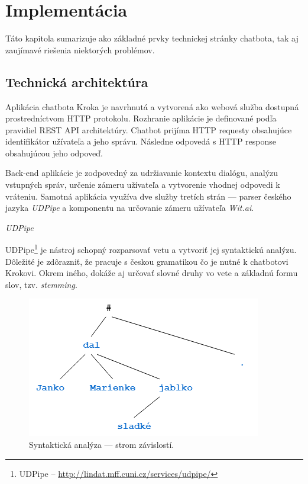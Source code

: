 \documentclass{ExcelAtFIT}
\begin{document}
\section{Implementácia}
Táto kapitola sumarizuje ako základné prvky technickej stránky chatbota, tak aj zaujímavé riešenia niektorých problémov.

\subsection{Technická architektúra}
Aplikácia chatbota Kroka je navrhnutá a vytvorená ako webová služba dostupná prostredníctvom HTTP protokolu. Rozhranie aplikácie je definované podľa pravidiel REST API architektúry. Chatbot prijíma HTTP requesty obsahujúce identifikátor užívateľa a jeho správu. Následne odpovedá s HTTP response obsahujúcou jeho odpoveď.

Back-end aplikácie je zodpovedný za udržiavanie kontextu dialógu, analýzu vstupných správ, určenie zámeru užívateľa a vytvorenie vhodnej odpovedi k vráteniu.
Samotná aplikácia využíva dve služby tretích strán --- parser českého jazyka \emph{UDPipe} a komponentu na určovanie zámeru užívateľa \emph{Wit.ai}.

\newpage
\textit{UDPipe}

\noindent UDPipe\footnote{UDPipe -- \url{http://lindat.mff.cuni.cz/services/udpipe/}} je nástroj schopný rozparsovať vetu a vytvoriť jej syntaktickú analýzu. Dôležité je zdôrazniť, že pracuje s českou gramatikou čo je nutné k chatbotovi Krokovi. Okrem iného, dokáže aj určovať slovné druhy vo vete a základnú formu slov, tzv. \emph{stemming}.

\begin{figure}[h]
	\centering
	\includegraphics[width=1\linewidth]{DependencyTree.png}
	\caption{Syntaktická analýza --- strom závislostí.}
	\label{tree}
\end{figure}
\end{document}
